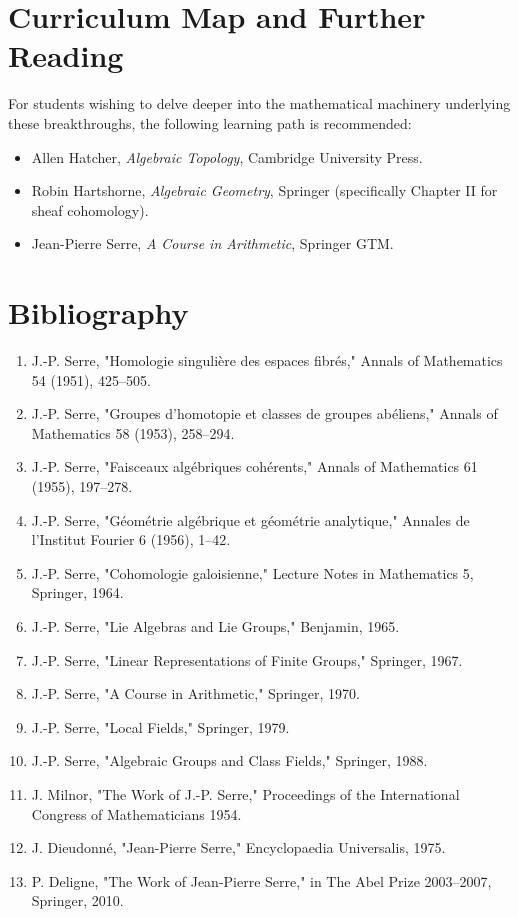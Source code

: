 \section{Curriculum Map and Further Reading}
For students wishing to delve deeper into the mathematical machinery underlying these breakthroughs, the following learning path is recommended:
\begin{itemize}
  \item Allen Hatcher, \emph{Algebraic Topology}, Cambridge University Press.
  \item Robin Hartshorne, \emph{Algebraic Geometry}, Springer (specifically Chapter II for sheaf cohomology).
  \item Jean-Pierre Serre, \emph{A Course in Arithmetic}, Springer GTM.
\end{itemize}

\section*{Bibliography}

\begin{enumerate}
\item J.-P. Serre, "Homologie singulière des espaces fibrés," Annals of Mathematics 54 (1951), 425--505.
\item J.-P. Serre, "Groupes d'homotopie et classes de groupes abéliens," Annals of Mathematics 58 (1953), 258--294.
\item J.-P. Serre, "Faisceaux algébriques cohérents," Annals of Mathematics 61 (1955), 197--278.
\item J.-P. Serre, "Géométrie algébrique et géométrie analytique," Annales de l'Institut Fourier 6 (1956), 1--42.
\item J.-P. Serre, "Cohomologie galoisienne," Lecture Notes in Mathematics 5, Springer, 1964.
\item J.-P. Serre, "Lie Algebras and Lie Groups," Benjamin, 1965.
\item J.-P. Serre, "Linear Representations of Finite Groups," Springer, 1967.
\item J.-P. Serre, "A Course in Arithmetic," Springer, 1970.
\item J.-P. Serre, "Local Fields," Springer, 1979.
\item J.-P. Serre, "Algebraic Groups and Class Fields," Springer, 1988.
\item J. Milnor, "The Work of J.-P. Serre," Proceedings of the International Congress of Mathematicians 1954.
\item J. Dieudonné, "Jean-Pierre Serre," Encyclopaedia Universalis, 1975.
\item P. Deligne, "The Work of Jean-Pierre Serre," in The Abel Prize 2003--2007, Springer, 2010.
\end{enumerate}
